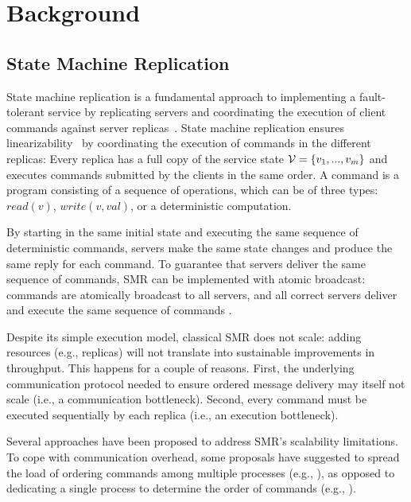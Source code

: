 \section{Background}

\subsection{State Machine Replication}
\label{sec:smr}

State machine replication is a fundamental approach to implementing a fault-tolerant service by replicating servers and coordinating the execution of client commands against server replicas~\cite{Lam78,Sch90}. 
State machine replication ensures linearizability~\cite{Attiya04} by coordinating the execution of commands in the different replicas: Every replica has a full copy of the service state $\mathcal{V} = \{v_1, ..., v_m\}$ and executes commands submitted by the clients in the same order. A command is a program consisting of a sequence of operations, which can be of three types: $read(v)$, $write(v, val)$, or a deterministic computation.

By starting in the same initial state and executing the same sequence of deterministic commands, servers make the same state changes and produce the same reply for each command. To guarantee that servers deliver the same sequence of commands, SMR can be implemented with atomic broadcast: commands are atomically broadcast to all servers, and all correct servers deliver and execute the same sequence of commands \cite{BJ87b,DSU04}.

Despite its simple execution model, classical SMR does not scale: adding resources (e.g., replicas) will not translate into sustainable improvements in throughput. This happens for a couple of reasons. First, the underlying communication protocol needed to ensure ordered message delivery may itself not scale (i.e., a communication bottleneck). Second, every command must be executed sequentially by each replica (i.e., an execution bottleneck).

Several approaches have been proposed to address SMR's scalability limitations. To cope with communication overhead, some proposals have suggested to spread the load of ordering commands among multiple processes (e.g., \cite{Moraru:2013gw,Mencius,Marandi:2012hb}), as opposed to dedicating a single process to determine the order of commands (e.g., \cite{Lamport:1998ea}).%


